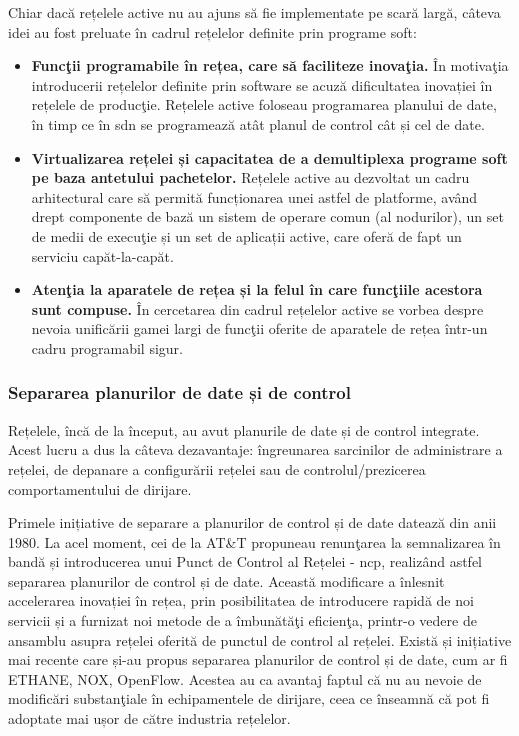 Chiar dacă rețelele active nu au ajuns să fie implementate pe scară largă, câteva idei au fost preluate în cadrul rețelelor definite prin programe soft:
\begin{itemize}
\item \textbf{Funcţii programabile în rețea, care să faciliteze inovaţia.} În motivaţia introducerii rețelelor definite prin software se acuză dificultatea inovației în rețelele de producţie. Rețelele active foloseau programarea planului de date, în timp ce în \gls{sdn} se programează atât planul de control cât și cel de date.
\item \textbf{Virtualizarea rețelei și capacitatea de a demultiplexa programe soft pe baza antetului pachetelor.} Rețelele active au dezvoltat un cadru arhitectural care să permită funcționarea unei astfel de platforme, având drept componente de bază un sistem de operare comun (al nodurilor), un set de medii de execuţie și un set de aplicații active, care oferă de fapt un serviciu capăt-la-capăt.
\item \textbf{Atenţia la aparatele de rețea și la felul în care funcţiile acestora sunt compuse.} În cercetarea din cadrul rețelelor active se vorbea despre nevoia unificării gamei largi de funcţii oferite de aparatele de rețea într-un cadru programabil sigur.
\end{itemize}

\subsubsection{Separarea planurilor de date și de control}

Rețelele, încă de la început, au avut planurile de date și de control integrate. Acest lucru a dus la câteva dezavantaje: îngreunarea sarcinilor de administrare a rețelei, de depanare a configurării rețelei sau de controlul/prezicerea comportamentului de dirijare.

Primele inițiative de separare a planurilor de control și de date datează din anii 1980. La acel moment, cei de la AT\&T propuneau renunţarea la semnalizarea în bandă și introducerea unui Punct de Control al Rețelei - \gls{ncp}, realizând astfel separarea planurilor de control și de date. Această modificare a înlesnit accelerarea inovației în rețea, prin posibilitatea de introducere rapidă de noi servicii și a furnizat noi metode de a îmbunătăţi eficienţa, printr-o vedere de ansamblu asupra rețelei oferită de punctul de control al rețelei. Există și inițiative mai recente care și-au propus separarea planurilor de control și de date, cum ar fi ETHANE, NOX, OpenFlow. Acestea au ca avantaj faptul că nu au nevoie de modificări substanţiale în echipamentele de dirijare, ceea ce înseamnă că pot fi adoptate mai ușor de către industria rețelelor.

